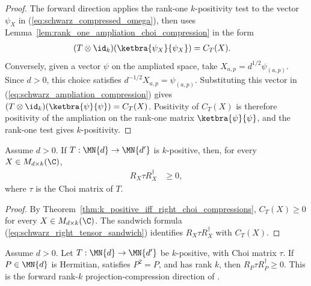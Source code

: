 \begin{proof}
    \leanok
    The forward direction applies the rank-one $k$-positivity test to the
    vector $\psi_X$ in (\ref{eq:schwarz_compressed_omega}), then uses
    Lemma~\ref{lem:rank_one_ampliation_choi_compression} in the form
    \begin{align}
        (T\otimes\id_k)(\ketbra{\psi_X}{\psi_X})
         & =C_T(X).
        \label{eq:schwarz_ampliation_compression}
    \end{align}
    Conversely, given a vector $\psi$ on the ampliated space, take
    $X_{a,p}=d^{1/2}\psi_{(a,p)}$. Since $d>0$, this choice satisfies
    $d^{-1/2}X_{a,p}=\psi_{(a,p)}$. Substituting this vector in
    (\ref{eq:schwarz_ampliation_compression}) gives
    $(T\otimes\id_k)(\ketbra{\psi}{\psi})=C_T(X)$.
    Positivity of $C_T(X)$ is therefore positivity of the ampliation on the
    rank-one matrix $\ketbra{\psi}{\psi}$, and the rank-one test gives
    $k$-positivity.
\end{proof}

\begin{theorem}
    \label{thm:k_positive_right_tensor_choi_sandwiches}
    \leanok
    Assume $d>0$. If
    $T:\MN{d}\to\MN{d'}$ is $k$-positive, then, for every
    $X\in M_{d\times k}(\C)$,
    \begin{align}
        R_X\tau R_X^\dagger
         & \ge0,
        \label{eq:schwarz_k_positive_choi_sandwich}
    \end{align}
    where $\tau$ is the Choi matrix of $T$.
\end{theorem}

\begin{proof}
    \leanok
    By Theorem~\ref{thm:k_positive_iff_right_choi_compressions},
    $C_T(X)\ge0$ for every $X\in M_{d\times k}(\C)$. The sandwich formula
    (\ref{eq:schwarz_right_tensor_sandwich}) identifies
    $R_X\tau R_X^\dagger$ with $C_T(X)$.
\end{proof}
\begin{theorem}
    \label{thm:rank_k_right_projection_choi_sandwich_forward}
    \leanok
    Assume $d>0$. Let $T:\MN{d}\to\MN{d'}$ be $k$-positive,
    with Choi matrix $\tau$. If $P\in\MN{d}$ is Hermitian, satisfies
    $P^2=P$, and has rank $k$, then $R_P\tau R_P^\dagger\geq0$.
    This is the forward rank-$k$ projection-compression direction of
    \cite[Chapter~3, Proposition~3.1]{Wolf2012Quantum}.
\end{theorem}

